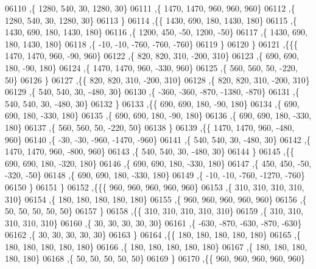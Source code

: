 \begin{DoxyCode}
06110     ,\{  1280,   540,    30,  1280,    30\}
06111     ,\{  1470,  1470,   960,   960,   960\}
06112     ,\{  1280,   540,    30,  1280,    30\}
06113     \}
06114    ,\{\{  1430,   690,   180,  1430,   180\}
06115     ,\{  1430,   690,   180,  1430,   180\}
06116     ,\{  1200,   450,   -50,  1200,   -50\}
06117     ,\{  1430,   690,   180,  1430,   180\}
06118     ,\{   -10,   -10,  -760,  -760,  -760\}
06119     \}
06120    \}
06121   ,\{\{\{  1470,  1470,   960,   -90,   960\}
06122     ,\{   820,   820,   310,  -200,   310\}
06123     ,\{   690,   690,   180,   -90,   180\}
06124     ,\{  1470,  1470,   960,  -330,   960\}
06125     ,\{   560,   560,    50,  -220,    50\}
06126     \}
06127    ,\{\{   820,   820,   310,  -200,   310\}
06128     ,\{   820,   820,   310,  -200,   310\}
06129     ,\{   540,   540,    30,  -480,    30\}
06130     ,\{  -360,  -360,  -870, -1380,  -870\}
06131     ,\{   540,   540,    30,  -480,    30\}
06132     \}
06133    ,\{\{   690,   690,   180,   -90,   180\}
06134     ,\{   690,   690,   180,  -330,   180\}
06135     ,\{   690,   690,   180,   -90,   180\}
06136     ,\{   690,   690,   180,  -330,   180\}
06137     ,\{   560,   560,    50,  -220,    50\}
06138     \}
06139    ,\{\{  1470,  1470,   960,  -480,   960\}
06140     ,\{   -30,   -30,  -960, -1470,  -960\}
06141     ,\{   540,   540,    30,  -480,    30\}
06142     ,\{  1470,  1470,   960,  -800,   960\}
06143     ,\{   540,   540,    30,  -480,    30\}
06144     \}
06145    ,\{\{   690,   690,   180,  -320,   180\}
06146     ,\{   690,   690,   180,  -330,   180\}
06147     ,\{   450,   450,   -50,  -320,   -50\}
06148     ,\{   690,   690,   180,  -330,   180\}
06149     ,\{   -10,   -10,  -760, -1270,  -760\}
06150     \}
06151    \}
06152   ,\{\{\{   960,   960,   960,   960,   960\}
06153     ,\{   310,   310,   310,   310,   310\}
06154     ,\{   180,   180,   180,   180,   180\}
06155     ,\{   960,   960,   960,   960,   960\}
06156     ,\{    50,    50,    50,    50,    50\}
06157     \}
06158    ,\{\{   310,   310,   310,   310,   310\}
06159     ,\{   310,   310,   310,   310,   310\}
06160     ,\{    30,    30,    30,    30,    30\}
06161     ,\{  -630,  -870,  -630,  -870,  -630\}
06162     ,\{    30,    30,    30,    30,    30\}
06163     \}
06164    ,\{\{   180,   180,   180,   180,   180\}
06165     ,\{   180,   180,   180,   180,   180\}
06166     ,\{   180,   180,   180,   180,   180\}
06167     ,\{   180,   180,   180,   180,   180\}
06168     ,\{    50,    50,    50,    50,    50\}
06169     \}
06170    ,\{\{   960,   960,   960,   960,   960\}

\end{DoxyCode}

